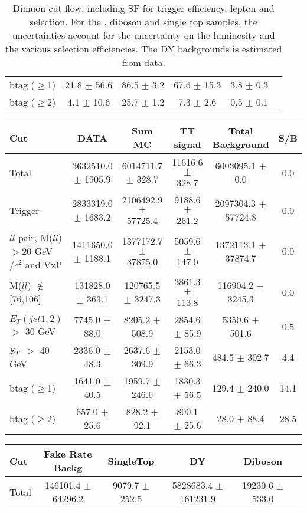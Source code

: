 \documentclass[amsmath,amssymb]{revtex4}
\begin{document}
\begin{landscape}
\begin{table}[p]
\begin{tabular}{|l|c|c|c|c|c|}
btag ($\ge$1) & 21.8 $\pm$ 56.6 & 86.5 $\pm$ 3.2 & 67.6 $\pm$ 15.3 & 3.8 $\pm$ 0.3 \\
btag ($\ge$2) & 4.1 $\pm$ 10.6 & 25.7 $\pm$ 1.2 & 7.3 $\pm$ 2.6 & 0.5 $\pm$ 0.1 \\
\hline 
\hline
\end{tabular}
\caption{Dimuon cut flow, including SF for trigger efficiency, lepton and \met selection. For the \ttbar, diboson and single top samples, the uncertainties account for the uncertainty on the luminosity and the various selection efficiencies. The DY backgrounds is estimated from data.}
\label{Table:CutFlow_mumu}
\end{table}
\end{landscape}
\clearpage
\begin{landscape}
\begin{table}[p]
\begin{tabular}{|l|c|c|c|c|c|}
\hline
\hline
Cut & DATA & Sum MC & TT signal  & Total Background & S/B \\
\hline
Total & 3632510.0 $\pm$ 1905.9 & 6014711.7 $\pm$ 328.7 & 11616.6 $\pm$ 328.7 & 6003095.1 $\pm$ 0.0 & 0.0 \\
Trigger & 2833319.0 $\pm$ 1683.2 & 2106492.9 $\pm$ 57725.4 & 9188.6 $\pm$ 261.2 & 2097304.3 $\pm$ 57724.8 & 0.0 \\
$ll$ pair, M($ll$)$>$20 GeV$/c^2$ and VxP & 1411650.0 $\pm$ 1188.1 & 1377172.7 $\pm$ 37875.0 & 5059.6 $\pm$ 147.0 & 1372113.1 $\pm$ 37874.7 & 0.0 \\
M($ll$) $\notin$ [76,106] & 131828.0 $\pm$ 363.1 & 120765.5 $\pm$ 3247.3 & 3861.3 $\pm$ 113.8 & 116904.2 $\pm$ 3245.3 & 0.0 \\
$E_T(jet1,2)$ $>$ 30 GeV & 7745.0 $\pm$ 88.0 & 8205.2 $\pm$ 508.9 & 2854.6 $\pm$ 85.9 & 5350.6 $\pm$ 501.6 & 0.5 \\
$\not\!\!E_T$ $>$ 40 GeV & 2336.0 $\pm$ 48.3 & 2637.6 $\pm$ 309.9 & 2153.0 $\pm$ 66.3 & 484.5 $\pm$ 302.7 & 4.4 \\
btag ($\ge$1) & 1641.0 $\pm$ 40.5 & 1959.7 $\pm$ 246.6 & 1830.3 $\pm$ 56.5 & 129.4 $\pm$ 240.0 & 14.1 \\
btag ($\ge$2) & 657.0 $\pm$ 25.6 & 828.2 $\pm$ 92.1 & 800.1 $\pm$ 25.6 & 28.0 $\pm$ 88.4 & 28.5 \\
\hline
\hline
\end{tabular}
\begin{tabular}{|l|c|c|c|c|c|}
\hline
\hline
Cut & Fake Rate Backg & SingleTop & DY & Diboson  \\
\hline
Total & 146101.4 $\pm$ 64296.2 & 9079.7 $\pm$ 252.5 & 5828683.4 $\pm$ 161231.9 & 19230.6 $\pm$ 533.0 \\

\end{tabular}
\end{table}
\end{landscape}
\end{document}
